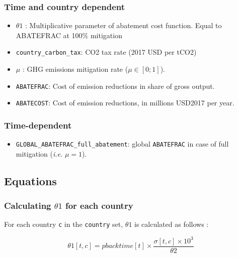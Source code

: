 \documentclass[
]{article}
\providecommand{\tightlist}{%
  \setlength{\itemsep}{0pt}\setlength{\parskip}{0pt}}
\begin{document}
\subsubsection{Time and country
dependent}\label{time-and-country-dependent-1}

\begin{itemize}
\tightlist
\item
  \(\theta1\) : Multiplicative parameter of abatement cost function.
  Equal to ABATEFRAC at 100\% mitigation
\item
  \texttt{country\_carbon\_tax}: CO2 tax rate (2017 USD per tCO2)
\item
  \(\mu\) : GHG emissions mitigation rate (\(\mu \in [0;1]\)).
\item
  \texttt{ABATEFRAC}: Cost of emission reductions in share of gross
  output.
\item
  \texttt{ABATECOST}: Cost of emission reductions, in millions USD2017
  per year.
\end{itemize}

\subsubsection{Time-dependent}\label{time-dependent-1}

\begin{itemize}
\tightlist
\item
  \texttt{GLOBAL\_ABATEFRAC\_full\_abatement}: global \texttt{ABATEFRAC}
  in case of full mitigation (\emph{i.e.} \(\mu = 1\)).
\end{itemize}

\subsection{Equations}\label{equations}

\subsubsection{\texorpdfstring{Calculating $\theta1$ for each
country}{Calculating theta1 for each country}}\label{calculating-theta1-for-each-country}

For each country \texttt{c} in the \texttt{country} set, \(\theta1\) is
calculated as follows :

\begin{equation}
\theta1[t,c] = pbacktime[t] \times \frac{\sigma[t,c] \times 10^3}{\theta2}
\end{equation}
\end{document}
